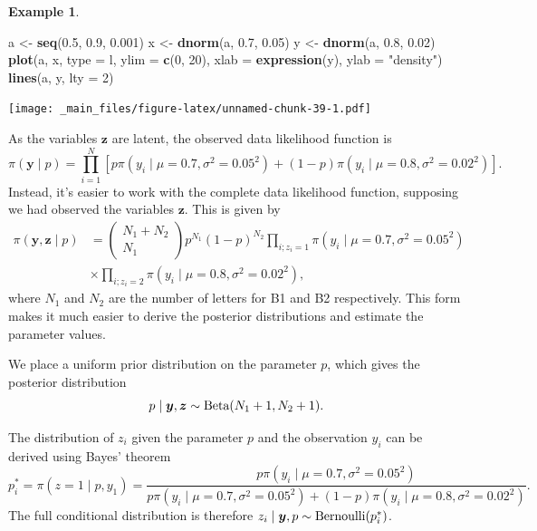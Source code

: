 \documentclass[
]{book}
\newenvironment{Shaded}{\begin{snugshade}}{\end{snugshade}}
\newcommand{\AttributeTok}[1]{\textcolor[rgb]{0.13,0.29,0.53}{#1}}
\newcommand{\DecValTok}[1]{\textcolor[rgb]{0.00,0.00,0.81}{#1}}
\newcommand{\FloatTok}[1]{\textcolor[rgb]{0.00,0.00,0.81}{#1}}
\newcommand{\FunctionTok}[1]{\textcolor[rgb]{0.13,0.29,0.53}{\textbf{#1}}}
\newcommand{\NormalTok}[1]{#1}
\newcommand{\OtherTok}[1]{\textcolor[rgb]{0.56,0.35,0.01}{#1}}
\newcommand{\StringTok}[1]{\textcolor[rgb]{0.31,0.60,0.02}{#1}}
\theoremstyle{definition}
\theoremstyle{definition}
\newtheorem{example}{Example}[chapter]
\theoremstyle{definition}
\theoremstyle{definition}
\theoremstyle{remark}
\begin{document}
\begin{example}
\begin{Shaded}
\begin{Highlighting}[]
\NormalTok{a }\OtherTok{\textless{}{-}} \FunctionTok{seq}\NormalTok{(}\FloatTok{0.5}\NormalTok{, }\FloatTok{0.9}\NormalTok{, }\FloatTok{0.001}\NormalTok{)}
\NormalTok{x }\OtherTok{\textless{}{-}} \FunctionTok{dnorm}\NormalTok{(a, }\FloatTok{0.7}\NormalTok{, }\FloatTok{0.05}\NormalTok{)}
\NormalTok{y }\OtherTok{\textless{}{-}} \FunctionTok{dnorm}\NormalTok{(a, }\FloatTok{0.8}\NormalTok{, }\FloatTok{0.02}\NormalTok{)}
\FunctionTok{plot}\NormalTok{(a, x, }\AttributeTok{type =} \StringTok{\textquotesingle{}l\textquotesingle{}}\NormalTok{, }\AttributeTok{ylim =} \FunctionTok{c}\NormalTok{(}\DecValTok{0}\NormalTok{, }\DecValTok{20}\NormalTok{), }\AttributeTok{xlab =} \FunctionTok{expression}\NormalTok{(y),}
     \AttributeTok{ylab =} \StringTok{"density"}\NormalTok{)}
\FunctionTok{lines}\NormalTok{(a, y, }\AttributeTok{lty =} \DecValTok{2}\NormalTok{)}
\end{Highlighting}
\end{Shaded}

\texttt{[image: \_main\_files/figure-latex/unnamed-chunk-39-1.pdf]}

As the variables \(\boldsymbol{z}\) are latent, the observed data likelihood function is
\[
\pi(\boldsymbol{y} \mid  p) =\prod_{i=1}^N \left[ p\pi(y_i \mid \mu = 0.7, \sigma^2 = 0.05^2) + (1-p)\pi(y_i \mid \mu = 0.8, \sigma^2 = 0.02^2)\right].
\]
Instead, it's easier to work with the complete data likelihood function, supposing we had observed the variables \(\boldsymbol{z}\). This is given by
\begin{align*}
\pi(\boldsymbol{y}, \boldsymbol{z} \mid  p) &= \begin{pmatrix} N_1 + N_2
\\ N_1\end{pmatrix}p^{N_1}(1-p)^{N_2} \prod_{i; z_i = 1}\pi(y_i \mid \mu = 0.7, \sigma^2 = 0.05^2)  \\
&\times\prod_{i; z_i = 2}\pi(y_i \mid \mu = 0.8, \sigma^2 = 0.02^2),
\end{align*}
where \(N_1\) and \(N_2\) are the number of letters for B1 and B2 respectively. This form makes it much easier to derive the posterior distributions and estimate the parameter values.

We place a uniform prior distribution on the parameter \(p\), which gives the posterior distribution
\[
p \mid \boldsymbol{y}, \boldsymbol{z} \sim \hbox{Beta}(N_1 + 1, N_2 + 1).
\]

The distribution of \(z_i\) given the parameter \(p\) and the observation \(y_i\) can be derived using Bayes' theorem
\[
p^*_i = \pi(z = 1 \mid p, y_1) = \frac{p\pi(y_i \mid \mu = 0.7, \sigma^2 = 0.05^2)}{p\pi(y_i \mid \mu = 0.7, \sigma^2 = 0.05^2) + (1-p)\pi(y_i \mid \mu = 0.8, \sigma^2 = 0.02^2)}.
\]
The full conditional distribution is therefore \(z_i \mid \boldsymbol{y}, p \sim \hbox{Bernoulli}(p^*_i)\).


\end{example}
\end{document}

